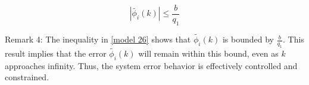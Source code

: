 \documentclass[journal,onecolumn]{IEEEtran}
\begin{document}
\begin{equation}
\label{model 26}
|\tilde{\phi_i}(k)| \leq \frac{b}{q_1}
\end{equation}



Remark 4: The inequality in \eqref{model 26} shows that \(\tilde{\phi_i}(k)\) is bounded by \(\frac{b}{q_1}\). This result implies that the error \(\tilde{\phi_i}(k)\) will remain within this bound, even as \(k\) approaches infinity. Thus, the system error behavior is effectively controlled and constrained.

    




\end{document}
